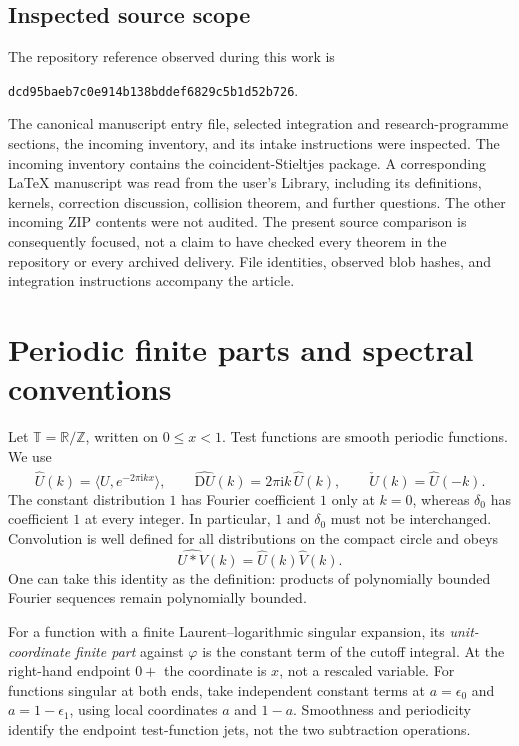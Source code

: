 \documentclass[11pt,a4paper]{article}
\numberwithin{equation}{section}
\theoremstyle{definition}
\newcommand{\R}{\mathbb R}
\newcommand{\Z}{\mathbb Z}
\newcommand{\T}{\mathbb T}
\newcommand{\ii}{\mathrm i}
\newcommand{\D}{\mathrm D}
\begin{document}
\subsection{Inspected source scope}
The repository reference observed during this work is
\begin{center}\small\texttt{dcd95baeb7c0e914b138bddef6829c5b1d52b726}.\end{center}
The canonical manuscript entry file, selected integration and research-programme sections, the incoming inventory, and its intake instructions were inspected. The incoming inventory contains the coincident-Stieltjes package. A corresponding \LaTeX{} manuscript was read from the user's Library, including its definitions, kernels, correction discussion, collision theorem, and further questions. The other incoming ZIP contents were not audited. The present source comparison is consequently focused, not a claim to have checked every theorem in the repository or every archived delivery. File identities, observed blob hashes, and integration instructions accompany the article.

\section{Periodic finite parts and spectral conventions}\label{pc:conventions}
Let $\T=\R/\Z$, written on $0\le x<1$. Test functions are smooth periodic functions. We use
\[
 \widehat U(k)=\langle U,e^{-2\pi\ii kx}\rangle,\qquad
 \widehat{\D U}(k)=2\pi\ii k\,\widehat U(k),\qquad
 \widehat{\check U}(k)=\widehat U(-k).
\]
The constant distribution $1$ has Fourier coefficient $1$ only at $k=0$, whereas $\delta_0$ has coefficient $1$ at every integer. In particular, $1$ and $\delta_0$ must not be interchanged. Convolution is well defined for all distributions on the compact circle and obeys
\[
 \widehat{U*V}(k)=\widehat U(k)\widehat V(k).
\]
One can take this identity as the definition: products of polynomially bounded Fourier sequences remain polynomially bounded.

For a function with a finite Laurent--logarithmic singular expansion, its \emph{unit-coordinate finite part} against $\varphi$ is the constant term of the cutoff integral. At the right-hand endpoint $0+$ the coordinate is $x$, not a rescaled variable. For functions singular at both ends, take independent constant terms at $a=\epsilon_0$ and $a=1-\epsilon_1$, using local coordinates $a$ and $1-a$. Smoothness and periodicity identify the endpoint test-function jets, not the two subtraction operations.
\end{document}
